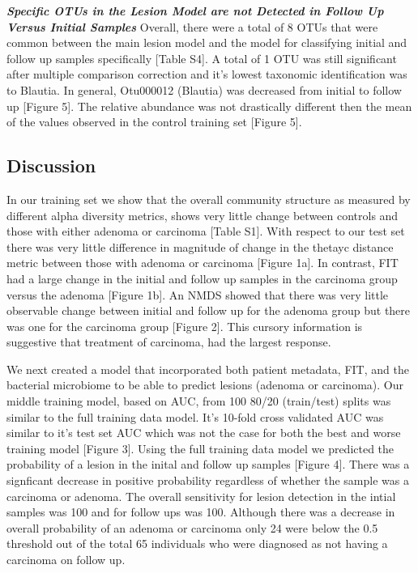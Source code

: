 \documentclass[12pt,]{article}
\begin{document}
\textbf{\emph{Specific OTUs in the Lesion Model are not Detected in
Follow Up Versus Initial Samples}} Overall, there were a total of 8 OTUs
that were common between the main lesion model and the model for
classifying initial and follow up samples specifically {[}Table S4{]}. A
total of 1 OTU was still significant after multiple comparison
correction and it's lowest taxonomic identification was to Blautia. In
general, Otu000012 (Blautia) was decreased from initial to follow up
{[}Figure 5{]}. The relative abundance was not drastically different
then the mean of the values observed in the control training set
{[}Figure 5{]}.

\newpage

\subsection{Discussion}\label{discussion}

In our training set we show that the overall community structure as
measured by different alpha diversity metrics, shows very little change
between controls and those with either adenoma or carcinoma {[}Table
S1{]}. With respect to our test set there was very little difference in
magnitude of change in the thetayc distance metric between those with
adenoma or carcinoma {[}Figure 1a{]}. In contrast, FIT had a large
change in the initial and follow up samples in the carcinoma group
versus the adenoma {[}Figure 1b{]}. An NMDS showed that there was very
little observable change between initial and follow up for the adenoma
group but there was one for the carcinoma group {[}Figure 2{]}. This
cursory information is suggestive that treatment of carcinoma, had the
largest response.

We next created a model that incorporated both patient metadata, FIT,
and the bacterial microbiome to be able to predict lesions (adenoma or
carcinoma). Our middle training model, based on AUC, from 100 80/20
(train/test) splits was similar to the full training data model. It's
10-fold cross validated AUC was similar to it's test set AUC which was
not the case for both the best and worse training model {[}Figure 3{]}.
Using the full training data model we predicted the probability of a
lesion in the inital and follow up samples {[}Figure 4{]}. There was a
signficant decrease in positive probability regardless of whether the
sample was a carcinoma or adenoma. The overall sensitivity for lesion
detection in the intial samples was 100 and for follow ups was 100.
Although there was a decrease in overall probability of an adenoma or
carcinoma only 24 were below the 0.5 threshold out of the total 65
individuals who were diagnosed as not having a carcinoma on follow up.
\end{document}
